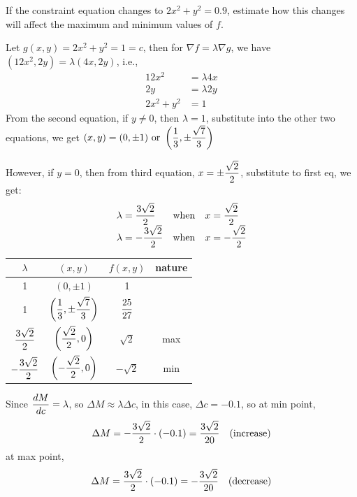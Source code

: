 \begin{spacing}{1.3}
    If the constraint equation changes to $2 x^{2}+y^{2}=0.9$, 
    estimate how this changes will affect the maximum and minimum values of $f$.

    \sol Let $g(x,y)=2x^2+y^2=1=c$, then for $\nabla f = \lambda \nabla g$, we have
    $(12x^2, 2y)=\lambda (4x, 2y)$, i.e., 
    \begin{align*}
        12x^2 &= \lambda 4x\\
        2y &= \lambda 2y\\
        2x^2+y^2&=1
    \end{align*}
    From the second equation, if $y\ne 0$, then $\lambda = 1$, substitute into the other two equations, 
    we get $\displaystyle (x,y)=(0, \pm 1){\rm \ or\ } \left(\frac{1}{3},\pm \frac{\sqrt{7}}{3}\right)$

    However, if $y=0$, then from third equation, $\displaystyle x=\pm \frac{\sqrt{2}}{2}$, substitute to first eq, 
    we get:
    $$\begin{array}{lll}
        \lambda = \dfrac{3\sqrt{2}}{2} & {\rm when} & x=\dfrac{\sqrt{2}}{2}\\
        \lambda = -\dfrac{3\sqrt{2}}{2} & {\rm when} & x=-\dfrac{\sqrt{2}}{2}
    \end{array}$$

    \begin{center}
        \begin{tabular}{|c|c|c|c|}\hline
            $\lambda$ & $(x,y)$ & $f(x,y)$ & nature \\\hline
            1 & $(0, \pm 1)$ & 1 &  \\\hline
            1 & $\displaystyle \left(\frac{1}{3},\pm \frac{\sqrt{7}}{3}\right)$ & $\displaystyle \frac{25}{27}$ &  \\\hline
            $\displaystyle \frac{3\sqrt{2}}{2}$ & $\displaystyle \left(\frac{\sqrt{2}}{2}, 0\right)$ & $\sqrt{2}$ & max \\\hline
            $\displaystyle -\frac{3\sqrt{2}}{2}$ & $\displaystyle \left(-\frac{\sqrt{2}}{2}, 0\right)$ & $-\sqrt{2}$ & min \\\hline        
        \end{tabular}
    \end{center}
    Since $\displaystyle \frac{dM}{dc}=\lambda$, so $\Delta M\approx \lambda \Delta c$, in this case, $\Delta c=-0.1$, so 
    at min point, 
    $$\Delta M=-\frac{3\sqrt{2}}{2}\cdot (-0.1)=\frac{3\sqrt{2}}{20}\quad {\rm (increase)}$$
    at max point,
    $$\Delta M=\frac{3\sqrt{2}}{2}\cdot (-0.1)=-\frac{3\sqrt{2}}{20}\quad {\rm (decrease)}$$


\end{spacing}
